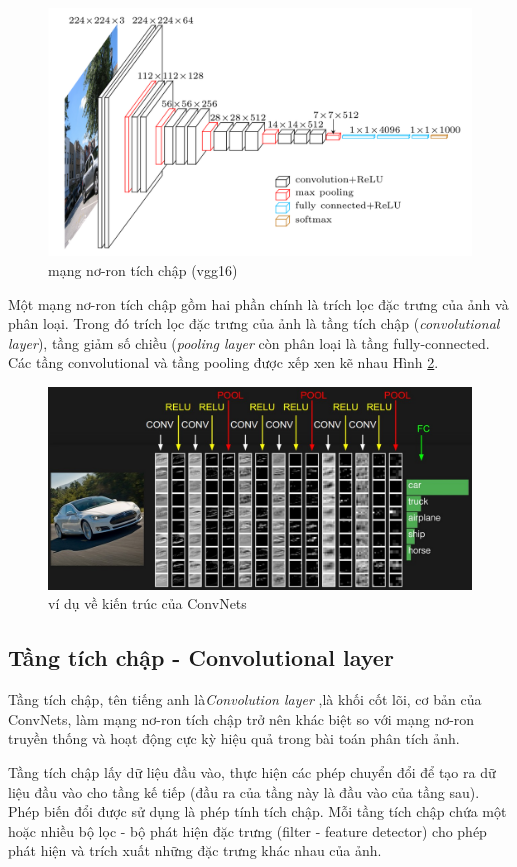 \begin{figure}[H]
\begin{center}
\includegraphics[width=.7\linewidth]{chap3/image/cnn/vgg16.png}
\end{center}
\caption{mạng nơ-ron tích chập (vgg16)}
\label{fig:conv_2}
\end{figure}

Một mạng nơ-ron tích chập gồm hai phần chính là trích lọc đặc trưng của ảnh và phân loại. Trong đó trích lọc đặc trưng của ảnh là tầng tích chập (\textit{convolutional layer}), tầng giảm số chiều (\textit{pooling layer} còn phân loại là tầng fully-connected. Các tầng convolutional và tầng pooling được xếp xen kẽ nhau Hình \ref{fig:convNetArch}.
\begin{center}
\begin{figure}[H]
	\begin{center}
		\includegraphics[scale=0.2]{chap3/image/cnn/convnet.jpeg}
	\end{center}
	\caption{ví dụ về kiến trúc của ConvNets}
\label{fig:convNetArch}
\end{figure}
\end{center}
\subsection{Tầng tích chập - Convolutional layer}
  Tầng tích chập, tên tiếng anh là\textit{Convolution layer} \cite{cs231n},là khối cốt lõi, cơ bản của ConvNets, làm mạng nơ-ron tích chập trở nên khác biệt so với mạng nơ-ron truyền thống và hoạt động cực kỳ hiệu quả trong bài toán phân tích ảnh. \par
Tầng tích chập lấy dữ liệu đầu vào, thực hiện các phép chuyển đổi để tạo ra dữ liệu đầu vào cho tầng kế tiếp (đầu ra của tầng này là đầu vào của tầng sau). Phép biến đổi được sử dụng là phép tính tích chập. Mỗi tầng tích chập chứa một hoặc nhiều bộ lọc - bộ phát hiện đặc trưng (filter - feature detector) cho phép phát hiện và trích xuất những đặc trưng khác nhau của ảnh.

